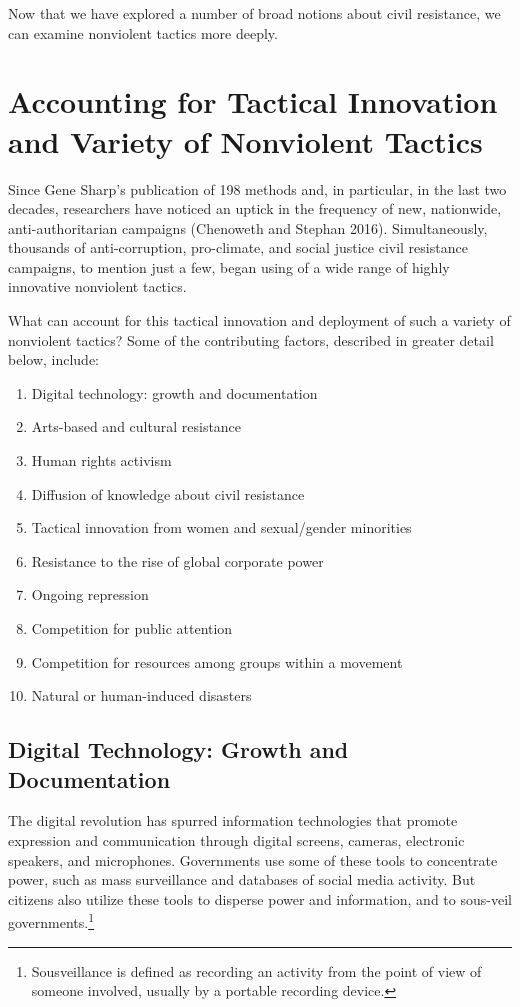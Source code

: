 \documentclass[twoside,a4paper,12pt,fleqn,openany]{extbook}
\begin{document}
Now that we have explored a number of broad notions about civil resistance, we can examine nonviolent tactics more deeply.

\chapter{Accounting for Tactical Innovation and Variety of Nonviolent Tactics}

Since Gene Sharp’s publication of 198 methods and, in particular, in the last two decades, researchers have noticed an uptick in the frequency of new, nationwide, anti-authoritarian campaigns (Chenoweth and Stephan 2016). Simultaneously, thousands of anti-corruption, pro-climate, and social justice civil resistance campaigns, to mention just a few, began using of a wide range of highly innovative nonviolent tactics.

What can account for this tactical innovation and deployment of such a variety of nonviolent tactics? Some of the contributing factors, described in greater detail below, include:

\begin{enumerate}
\item Digital technology: growth and documentation
\item Arts-based and cultural resistance
\item Human rights activism
\item Diffusion of knowledge about civil resistance
\item Tactical innovation from women and sexual/gender minorities
\item Resistance to the rise of global corporate power
\item Ongoing repression
\item Competition for public attention
\item Competition for resources among groups within a movement
\item Natural or human-induced disasters
\end{enumerate}

\section*{Digital Technology: Growth and Documentation}

The digital revolution has spurred information technologies that promote expression and communication through digital screens, cameras, electronic speakers, and microphones. Governments use some of these tools to concentrate power, such as mass surveillance and databases of social media activity. But citizens also utilize these tools to disperse power and information, and to sous-veil governments.\footnote{Sousveillance is defined as recording an activity from the point of view of someone involved, usually by a portable recording device.}
\end{document}
